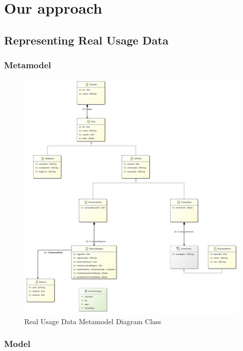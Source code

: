 \chead{}
\chapter{Our approach}


\section{Representing Real Usage Data }

\subsection{Metamodel}

\vspace{0.5cm}
\begin{figure}[H]
  \centering
    \includegraphics[width=12cm]{images/diagrams/RealUsageDataMetamodel.jpg}
  \caption{Real Usage Data Metamodel Diagram Class}
  \label{fig:real-usage-data-metamodel-diagram-class}
\end{figure}
\vspace{0.5cm}


\subsection{Model}

